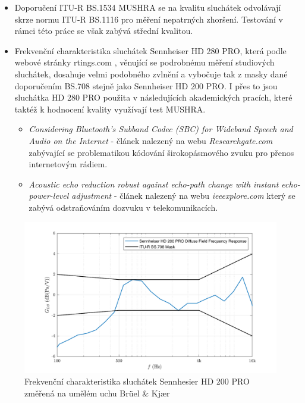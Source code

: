  \begin{itemize}
     \item Doporučení ITU-R BS.1534 MUSHRA se na kvalitu sluchátek odvolávají skrze normu ITU-R BS.1116 pro měření nepatrných zhoršení. Testování v rámci této práce se však zabývá střední kvalitou. 
     \item Frekvenční charakteristika sluchátek Sennheiser HD 280 PRO, která podle webové stránky rtings.com \cite{web:rtings}, věnující se podrobnému měření studiových sluchátek, dosahuje velmi podobného zvlnění a vybočuje tak z masky dané doporučením BS.708 stejně jako Sennheiser HD 200 PRO. I přes to jsou sluchátka HD 280 PRO použita v následujících akademických pracích, které taktéž k hodnocení kvality využívají test MUSHRA.
     \begin{itemize}
         \item \textit{Considering Bluetooth's Subband Codec (SBC) for Wideband Speech and Audio on the Internet} \cite{headphones1} - článek nalezený na webu \textit{Researchgate.com} zabývající se problematikou kódování širokopásmového zvuku pro přenos internetovým rádiem.
         \item \textit{Acoustic echo reduction robust against echo-path change with instant echo-power-level adjustment} \cite{headphones2} - článek nalezený na webu \textit{ieeexplore.com} který se zabývá odstraňováním dozvuku v telekomunikacích.
     \end{itemize}
 \end{itemize}

\begin{figure}[h]
    \centering
    \includegraphics[width = \textwidth]{pic/headphones.pdf}
    \caption{Frekvenční charakteristika sluchátek Sennhesier HD 200 PRO změřená na umělém uchu Brüel \& Kjær}
    \label{pic:hd200}
\end{figure}


